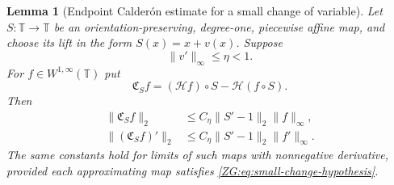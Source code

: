 \documentclass[11pt]{amsart}
\numberwithin{equation}{section}
\newtheorem{lemma}[theorem]{Lemma}
\theoremstyle{definition}
\theoremstyle{remark}
\newcommand{\T}{\mathbb T}
\newcommand{\Hil}{\mathcal H}
\begin{document}
\begin{lemma}[Endpoint Calder\'on estimate for a small change of variable]
\label{ZG:lem:small-change}
Let $S:\T\to\T$ be an orientation-preserving, degree-one, piecewise
affine map, and choose its lift in the form $S(x)=x+v(x)$.  Suppose
\begin{equation}\label{ZG:eq:small-change-hypothesis}
 \|v'\|_\infty\le\eta<1.
\end{equation}
For $f\in W^{1,\infty}(\T)$ put
\[
 \mathfrak C_Sf=(\Hil f)\circ S-\Hil(f\circ S).
\]
Then
\begin{align}
 \|\mathfrak C_Sf\|_2
 &\le C_\eta\|S'-1\|_2\|f\|_\infty,
 \label{ZG:eq:small-change-H0}\\
 \|(\mathfrak C_Sf)'\|_2
 &\le C_\eta\|S'-1\|_2\|f'\|_\infty.
 \label{ZG:eq:small-change-H1}
\end{align}
The same constants hold for limits of such maps with nonnegative
derivative, provided each approximating map satisfies
\eqref{ZG:eq:small-change-hypothesis}.
\end{lemma}
\end{document}
